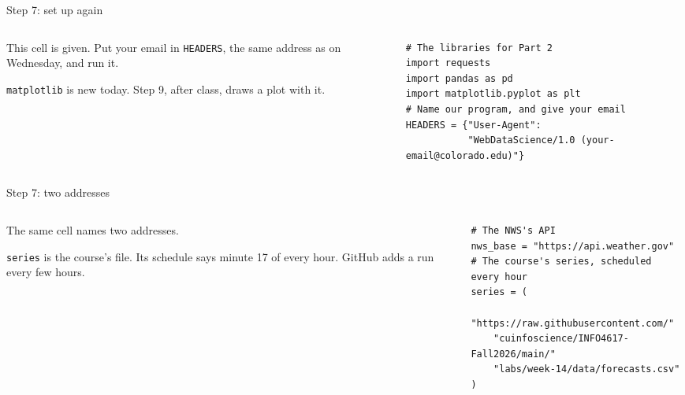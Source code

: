 \documentclass[9pt,aspectratio=169]{beamer}
\begin{document}
\begin{frame}[fragile]{Step 7: set up again}
    \begin{columns}[T]
        \begin{column}{0.37\textwidth}
            This cell is given. Put your email in \texttt{HEADERS}, the same address as on Wednesday, and run it.

            \medskip
            \texttt{matplotlib} is new today. Step 9, after class, draws a plot with it.
        \end{column}
        \begin{column}{0.6\textwidth}
\begin{lstlisting}
# The libraries for Part 2
import requests
import pandas as pd
import matplotlib.pyplot as plt
# Name our program, and give your email
HEADERS = {"User-Agent":
           "WebDataScience/1.0 (your-email@colorado.edu)"}
\end{lstlisting}
        \end{column}
    \end{columns}
\end{frame}

\begin{frame}[fragile]{Step 7: two addresses}
    \begin{columns}[T]
        \begin{column}{0.37\textwidth}
            The same cell names two addresses.

            \medskip
            \texttt{series} is the course's file. Its schedule says minute 17 of every hour. GitHub adds a run every few hours.
        \end{column}
        \begin{column}{0.6\textwidth}
\begin{lstlisting}
# The NWS's API
nws_base = "https://api.weather.gov"
# The course's series, scheduled every hour
series = (
    "https://raw.githubusercontent.com/"
    "cuinfoscience/INFO4617-Fall2026/main/"
    "labs/week-14/data/forecasts.csv"
)
\end{lstlisting}
        \end{column}
    \end{columns}
\end{frame}
\end{document}
